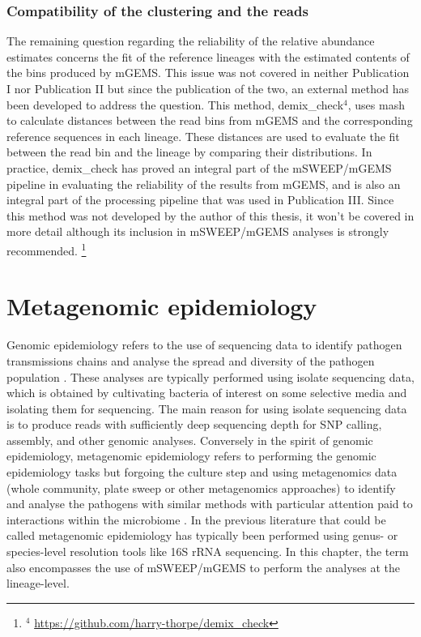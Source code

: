 \documentclass[officiallayout]{tktla}
\begin{document}
\subsection{Compatibility of the clustering and the reads}

The remaining question regarding the reliability of the relative
abundance estimates concerns the fit of the reference lineages with
the estimated contents of the bins produced by mGEMS. This issue was
not covered in neither Publication I nor Publication II but since the
publication of the two, an external method has been developed to
address the question. This method, demix\_check$^{4}$, uses mash
\citep{ondov2016mash} to calculate distances between the read bins
from mGEMS and the corresponding reference sequences in each
lineage. These distances are used to evaluate the fit between the read
bin and the lineage by comparing their distributions. In practice,
demix\_check has proved an integral part of the mSWEEP/mGEMS pipeline
in evaluating the reliability of the results from mGEMS, and is also
an integral part of the processing pipeline that was used in
Publication III. Since this method was not developed by the author of
this thesis, it won't be covered in more detail although its inclusion
in mSWEEP/mGEMS analyses is strongly recommended.
\noindent\let\thefootnote\relax\footnote{$^{4}$ \url{https://github.com/harry-thorpe/demix_check}}

\chapter{Metagenomic epidemiology}
\label{section:metagenomic-epidemiology}

Genomic epidemiology refers to the use of sequencing data to identify
pathogen transmissions chains and analyse the spread and diversity of
the pathogen population \citep{tang2017infection,
  grad2014epidemiologic, kwong2015whole}. These analyses are typically
performed using isolate sequencing data, which is obtained by
cultivating bacteria of interest on some selective media and isolating
them for sequencing. The main reason for using isolate sequencing data
is to produce reads with sufficiently deep sequencing depth for SNP
calling, assembly, and other genomic analyses. Conversely in the
spirit of genomic epidemiology, metagenomic epidemiology refers to
performing the genomic epidemiology tasks but forgoing the culture
step and using metagenomics data (whole community, plate sweep or other metagenomics
approaches) to identify and analyse the pathogens with similar methods
with particular attention paid to interactions within the microbiome
\citep{francis2015metagenomic, baquero2012metagenomic}. In the
previous literature that could be called metagenomic epidemiology has
typically been performed using genus- or species-level resolution
tools like 16S rRNA sequencing. In this chapter, the term also
encompasses the use of mSWEEP/mGEMS to perform the analyses at the
lineage-level.
\end{document}
